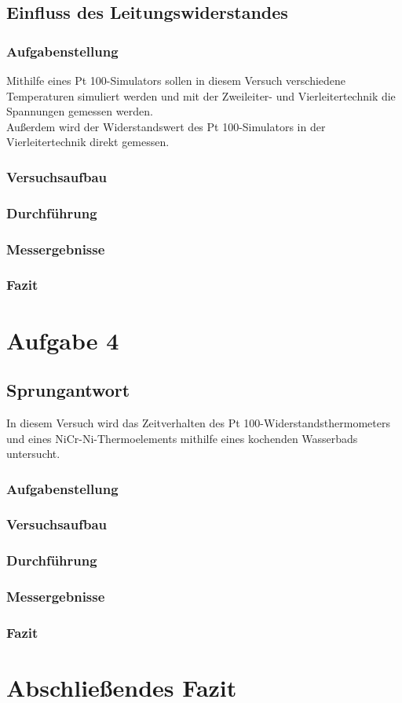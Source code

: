 \documentclass[a4paper,11pt,oneside]{article}
\begin{document}
\subsection{Einfluss des Leitungswiderstandes}
\subsubsection{Aufgabenstellung}
Mithilfe eines Pt 100-Simulators sollen in diesem Versuch verschiedene Temperaturen simuliert werden und mit der Zweileiter- und Vierleitertechnik die Spannungen gemessen werden. \\
Außerdem wird der Widerstandswert des Pt 100-Simulators in der Vierleitertechnik direkt gemessen. 
\subsubsection{Versuchsaufbau}
\subsubsection{Durchführung}
\subsubsection{Messergebnisse}
\subsubsection{Fazit}


\section{Aufgabe 4}
\subsection{Sprungantwort}
In diesem Versuch wird das Zeitverhalten des Pt 100-Widerstandsthermometers und eines NiCr-Ni-Thermoelements mithilfe eines kochenden Wasserbads untersucht. 
\subsubsection{Aufgabenstellung}
\subsubsection{Versuchsaufbau}
\subsubsection{Durchführung}
\subsubsection{Messergebnisse}
\subsubsection{Fazit}

\section{Abschließendes Fazit}
\end{document}
